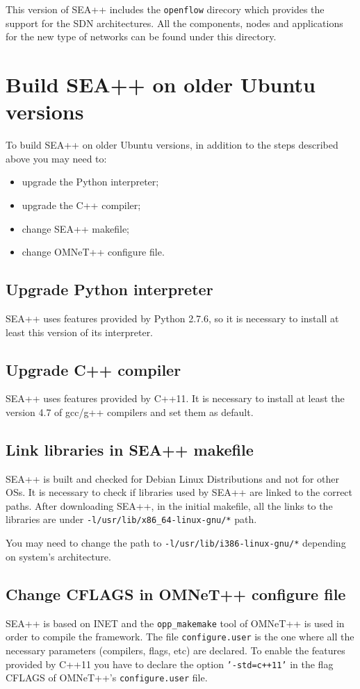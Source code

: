 This version of SEA++ includes the \texttt{openflow} direcory which provides the support for the SDN architectures. All the components, nodes and applications for the new type of networks can be found under this directory.

\section{Build SEA++ on older Ubuntu versions}
To build SEA++ on older Ubuntu versions, in addition to the steps described above you may need to:
%
\begin{itemize}
\item upgrade the Python interpreter;
\item upgrade the C++ compiler;
\item change SEA++ makefile;
\item change OMNeT++ configure file.
\end{itemize}

\subsection{Upgrade Python interpreter}
SEA++ uses features provided by Python 2.7.6, so it is necessary to install at least this version of its interpreter.

\subsection{Upgrade C++ compiler}
SEA++ uses features provided by C++11. It is necessary to install at least the version 4.7 of gcc/g++ compilers and set them as default.


\subsection{Link libraries in SEA++ makefile}
SEA++ is built and checked for Debian Linux Distributions and not for other OSs. It is necessary to check if libraries used by SEA++ are linked to the correct paths. After downloading SEA++, in the initial makefile, all the links to the libraries are under \texttt{-l/usr/lib/x86\_64-linux-gnu/*} path.

You may need to change the path to \texttt{-l/usr/lib/i386-linux-gnu/*} depending on system's architecture.


\subsection{Change CFLAGS in OMNeT++ configure file}
SEA++ is based on INET and the \texttt{opp\_makemake} tool of OMNeT++ is used in order to compile the framework. The file \texttt{configure.user} is the one where all the necessary parameters (compilers, flags, etc) are declared. To enable the features provided by C++11 you have to declare the option \texttt{'-std=c++11'} in the flag CFLAGS of OMNeT++'s \texttt{configure.user} file.

